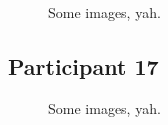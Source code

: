 \begin{figure}[h]
	\caption{Some images, yah.}
\end{figure}

\lipsum[1]


\clearpage

\subsection{Participant 17}

\begin{figure}[h]
	\caption{Some images, yah.}
\end{figure}

\lipsum[1]

\clearpage

